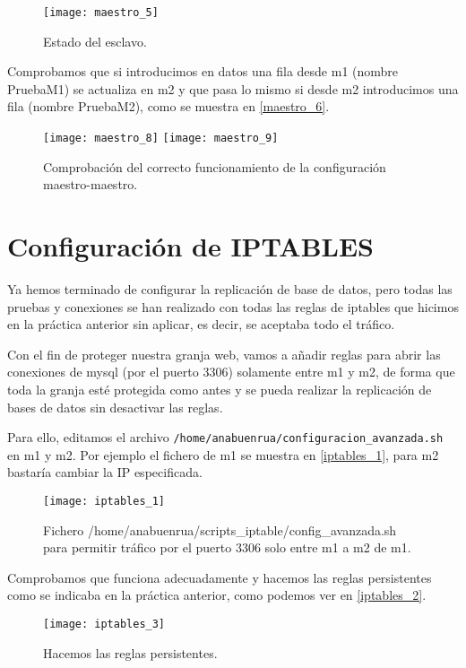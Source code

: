 \begin{figure}[h!]
\begin{center}
\caption{Estado del esclavo.}
\label{maestro_5}
\texttt{[image: maestro\_5]}
\end{center}
\end{figure}

Comprobamos que si introducimos en datos una fila desde m1 (nombre PruebaM1) se actualiza en m2 y que pasa lo mismo si desde m2 introducimos una fila (nombre PruebaM2), como se muestra en \eqref{maestro_6}.

\begin{figure}[h!]
\begin{center}
\caption{Comprobación del correcto funcionamiento de la configuración maestro-maestro.}
\label{maestro_6}
\texttt{[image: maestro\_8]}
\texttt{[image: maestro\_9]}
\end{center}
\end{figure}


\chapter{Configuración de IPTABLES}

Ya hemos terminado de configurar la replicación de base de datos, pero todas las pruebas y conexiones se han realizado con todas las reglas de iptables que hicimos en la práctica anterior sin aplicar, es decir, se aceptaba todo el tráfico.

Con el fin de proteger nuestra granja web, vamos a añadir reglas para abrir las conexiones de mysql (por el puerto 3306) solamente entre m1 y m2, de forma que toda la granja esté protegida como antes y se pueda realizar la replicación de bases de datos sin desactivar las reglas.

Para ello, editamos el archivo \verb|/home/anabuenrua/configuracion_avanzada.sh| en m1 y m2. Por ejemplo el fichero de m1 se muestra en \eqref{iptables_1}, para m2 bastaría cambiar la IP especificada.

\begin{figure}[h!]
\begin{center}
\caption{Fichero /home/anabuenrua/scripts\_iptable/config\_avanzada.sh para permitir tráfico por el puerto 3306 solo entre m1 a m2 de m1.}
\label{iptables_1}
\texttt{[image: iptables\_1]}
\end{center}
\end{figure}

Comprobamos que funciona adecuadamente y hacemos las reglas persistentes como se indicaba en la práctica anterior, como podemos ver en \eqref{iptables_2}.

\begin{figure}[h!]
\begin{center}
\caption{Hacemos las reglas persistentes.}
\label{iptables_2}
\texttt{[image: iptables\_3]}
\end{center}
\end{figure}

